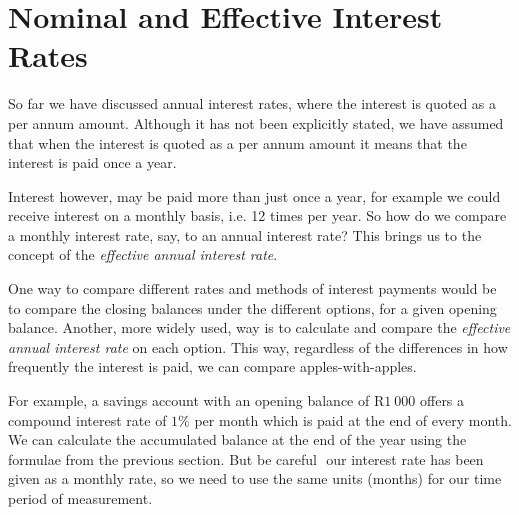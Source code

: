 
\section{Nominal and Effective Interest Rates}
\label{m:f11:nominal}

So far we have discussed annual interest rates, where the interest is quoted as a per annum amount. Although it has not been explicitly stated, we have assumed that when the interest is quoted as a per annum amount it means that the interest is paid once a year.

Interest however, may be paid more than just once a year, for example we could receive interest on a monthly basis, i.e. 12 times per year. So how do we compare a monthly interest rate, say, to an annual interest rate? This brings us to the concept of the \textit{effective annual interest rate}.

One way to compare different rates and methods of interest payments would be to compare the closing balances under the different options, for a given opening balance. Another, more widely used, way is to calculate and compare the \textit{effective annual interest rate} on each option. This way, regardless of the differences in how frequently the interest is paid, we can compare apples-with-apples.

For example, a savings account with an opening balance of R$1~000$ offers a compound interest rate of $1\%$ per month which is paid at the end of every month. We can calculate the accumulated balance at the end of the year using the formulae from the previous section. But be careful  our interest rate has been given as a monthly rate, so we need to use the same units (months) for our time period of measurement.

